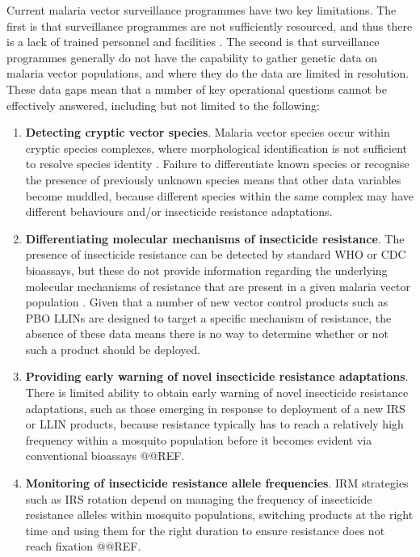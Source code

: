 \documentclass[a4paper,11pt,abstracton,hidelinks]{scrartcl}
\begin{document}
Current malaria vector surveillance programmes have two key limitations.
%
The first is that surveillance programmes are not sufficiently resourced, and thus there is a lack of trained personnel and facilities \citep{Russell2020}.
%
The second is that surveillance programmes generally do not have the capability to gather genetic data on malaria vector populations, and where they do the data are limited in resolution.
%
These data gaps mean that a number of key operational questions cannot be effectively answered, including but not limited to the following:
\begin{enumerate}
%
\item \textbf{Detecting cryptic vector species}. 
%
Malaria vector species occur within cryptic species complexes, where morphological identification is not sufficient to resolve species identity \citep{Davidson1964,Coetzee2013}. 
%
Failure to differentiate known species or recognise the presence of previously unknown species means that other data variables become muddled, because different species within the same complex may have different behaviours and/or insecticide resistance adaptations.
%
\item \textbf{Differentiating molecular mechanisms of insecticide resistance}.
%
The presence of insecticide resistance can be detected by standard WHO or CDC bioassays, but these do not provide information regarding the underlying molecular mechanisms of resistance that are present in a given malaria vector population \citep{WHO2018TPIRM}.
%
Given that a number of new vector control products such as PBO LLINs are designed to target a specific mechanism of resistance, the absence of these data means there is no way to determine whether or not such a product should be deployed.
%
\item \textbf{Providing early warning of novel insecticide resistance adaptations}.
%
There is limited ability to obtain early warning of novel insecticide resistance adaptations, such as those emerging in response to deployment of a new IRS or LLIN products, because resistance typically has to reach a relatively high frequency within a mosquito population before it becomes evident via conventional bioassays @@REF.
%
\item \textbf{Monitoring of insecticide resistance allele frequencies}.
%
IRM strategies such as IRS rotation depend on managing the frequency of insecticide resistance alleles within mosquito populations, switching products at the right time and using them for the right duration to ensure resistance does not reach fixation @@REF. 

\end{enumerate}
\end{document}
